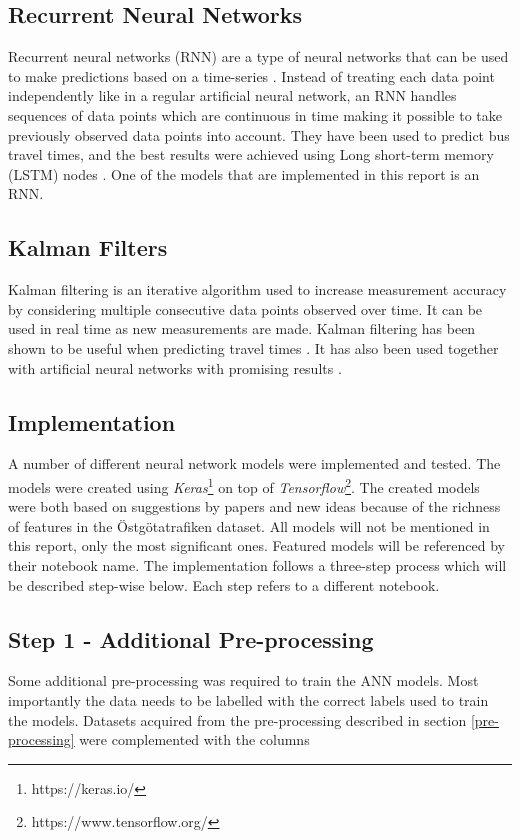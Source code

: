 \subsection{Recurrent Neural Networks}
Recurrent neural networks (RNN) are a type of neural networks that can be used to make predictions based on a time-series \cite{RNN}. Instead of treating each data point independently like in a regular artificial neural network, an RNN handles sequences of data points which are continuous in time making it possible to take previously observed data points into account. They have been used to predict bus travel times, and the best results were achieved using Long short-term memory (LSTM) nodes \cite{RNNBusPredictions}. One of the models that are implemented in this report is an RNN. 

\subsection{Kalman Filters}
Kalman filtering is an iterative algorithm used to increase measurement accuracy by considering multiple consecutive data points observed over time. It can be used in real time as new measurements are made. Kalman filtering has been shown to be useful when predicting travel times \cite{kalmanPrediction}. It has also been used together with artificial neural networks with promising results \cite{kalmanANN}.

\subsection{Implementation}
A number of different neural network models were implemented and tested. The models were created using \textit{Keras}\footnote{https://keras.io/} on top of \textit{Tensorflow}\footnote{https://www.tensorflow.org/}. The created models were both based on suggestions by papers and new ideas because of the richness of features in the Östgötatrafiken dataset. All models will not be mentioned in this report, only the most significant ones. Featured models will be referenced by their notebook name. The implementation follows a three-step process which will be described step-wise below. Each step refers to a different notebook.

\subsection{Step 1 - Additional Pre-processing}
Some additional pre-processing was required to train the ANN models. Most importantly the data needs to be labelled with the correct labels used to train the models. Datasets acquired from the pre-processing described in section \ref{pre-processing} were complemented with the columns

